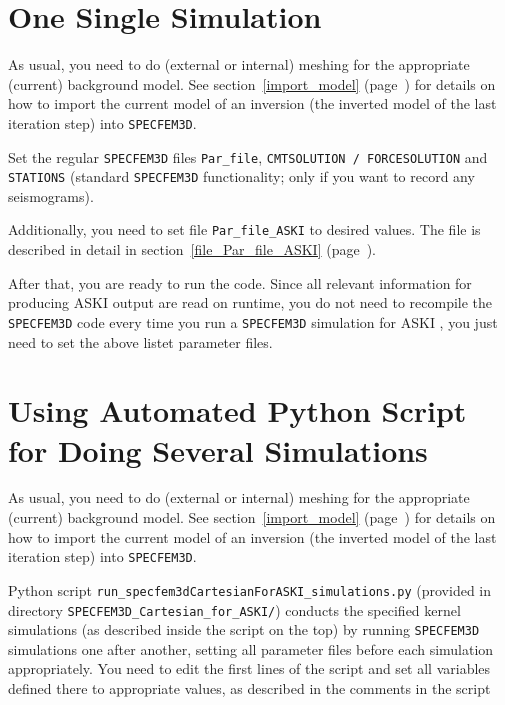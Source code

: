 \documentclass[12pt,a4paper]{article}
\newcommand{\lcode}[1]{\nolinkurl{#1}}
\newcommand{\ASKI}{ {\ttfamily ASKI} }
\newcommand{\myref}[1]{\ref{#1} (page~\pageref{#1})}
\begin{document}
%
\section{One Single Simulation} \label{no_script}
%
As usual, you need to do (external or internal) meshing for the appropriate (current) background model. 
See section~\myref{import_model} for details on how to import the current model of an inversion (the inverted
model of the last iteration step) into \lcode{SPECFEM3D}.

Set the regular \lcode{SPECFEM3D} files \lcode{Par_file}, \lcode{CMTSOLUTION / FORCESOLUTION} 
and \lcode{STATIONS} (standard \lcode{SPECFEM3D} functionality; only if you want to record any seismograms).

Additionally, you need to set file \lcode{Par_file_ASKI} to desired values. The file is described 
in detail in section~\myref{file_Par_file_ASKI}. 

After that, you are ready to run the code. Since all relevant information for producing \ASKI{} output 
are read on runtime, you do not need to recompile the \lcode{SPECFEM3D} code every time you
run a \lcode{SPECFEM3D} simulation for \ASKI{}, you just need to set the above listet parameter files.
%
\section{Using Automated Python Script for Doing Several Simulations} \label{use_script}
%
As usual, you need to do (external or internal) meshing for the appropriate (current) background model. 
See section~\myref{import_model} for details on how to import the current model of an inversion (the inverted
model of the last iteration step) into \lcode{SPECFEM3D}.

Python script \lcode{run_specfem3dCartesianForASKI_simulations.py} (provided in directory 
\lcode{SPECFEM3D_Cartesian_for_ASKI/}) conducts the specified 
kernel simulations (as described inside the script on the top) by running 
\lcode{SPECFEM3D} simulations one after another, setting all parameter files before each simulation appropriately.
You need to edit the first lines of the script 
and set all variables defined there to appropriate values, as described in the comments in the script 
\end{document}
